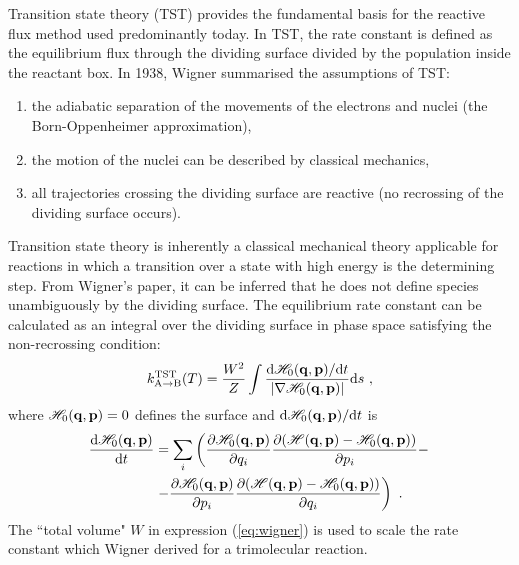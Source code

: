 Transition state theory\cite{Polanyi1920, Wigner1937, Wigner1939} (TST) provides the fundamental basis for the reactive flux method used predominantly today.
In TST, the rate constant is defined as the equilibrium flux through the dividing surface divided by the population inside the reactant box.
In 1938, Wigner summarised\cite{Wigner1938} the assumptions of TST:
\begin{enumerate}
\item the adiabatic separation of the movements of the electrons and nuclei (the \mbox{Born-Oppenheimer\cite{Born1927}} approximation),
\item the motion of the nuclei can be described by classical mechanics,
\item all trajectories crossing the dividing surface are reactive (no recrossing of the dividing surface occurs).
\end{enumerate}
Transition state theory is inherently a classical mechanical theory applicable for reactions in which a transition over a state with high energy is the determining \mbox{step.\cite{Wigner1937}}
From Wigner's paper,\cite{Wigner1937} it can be inferred that he does not define species unambiguously by the dividing surface.
The equilibrium rate constant can be calculated as an integral over the dividing surface in phase space satisfying the non-recrossing condition:
\begin{equation}
\label{eq:wigner}
k^{\rm TST}_{\rm A\rightarrow B}(T) = \frac{W^2}{Z} \int \frac{{\rm d} \mathscr{H}_0 ({\bf q},{\bf p}) / {\rm d} t}{|\nabla \mathscr{H}_0 ({\bf q},{\bf p}) |} {\rm d} s ~,
\end{equation}
where $\mathscr{H}_0 ({\bf q},{\bf p}) = 0$ defines the surface and ${\rm d} \mathscr{H}_0 ({\bf q},{\bf p})/ {\rm d} t$ is
\begin{equation}
\label{eq:diff-H}
\begin{split}
\frac{{\rm d} \mathscr{H}_0 ({\bf q},{\bf p})}{{\rm d} t}  & = \sum_i \left( \frac{\partial \mathscr{H}_0 ({\bf q},{\bf p})}{\partial q_i} \frac{\partial (\mathscr{H}({\bf q},{\bf p}) - \mathscr{H}_0 ({\bf q},{\bf p}))}{\partial p_i} - \right.
\\
& \left. - \frac{\partial \mathscr{H}_0 ({\bf q},{\bf p})}{\partial p_i} \frac{\partial (\mathscr{H}({\bf q},{\bf p}) - \mathscr{H}_0 ({\bf q},{\bf p}))}{\partial q_i} \right) ~. \\
\end{split}
\end{equation}
The ``total volume" $W$ in expression (\ref{eq:wigner}) is used to scale the rate constant which Wigner derived for a trimolecular reaction.

